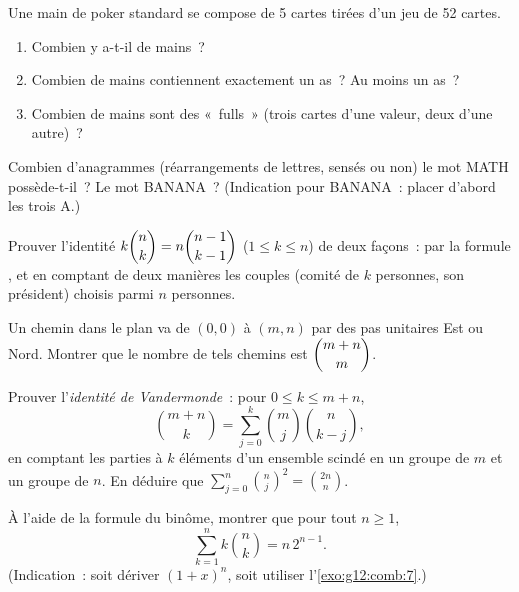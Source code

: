\begin{exercise}[$\star\star$]\label{exo:g12:comb:5}
Une main de poker standard se compose de 5 cartes tirées d'un jeu de 52
cartes.
\begin{enumerate}
  \item Combien y a-t-il de mains~?
  \item Combien de mains contiennent exactement un as~? Au moins un as~?
  \item Combien de mains sont des «~fulls~» (trois cartes d'une valeur, deux
        d'une autre)~?
\end{enumerate}
\end{exercise}

\begin{exercise}[$\star\star$]\label{exo:g12:comb:6}
Combien d'anagrammes (réarrangements de lettres, sensés ou non) le mot MATH
possède-t-il~? Le mot BANANA~?
(Indication pour BANANA~: placer d'abord les trois A.)
\end{exercise}

\begin{exercise}[$\star\star$]\label{exo:g12:comb:7}
Prouver l'identité $k\dbinom{n}{k} = n\dbinom{n-1}{k-1}$
($1 \leq k \leq n$) de deux façons~: par la formule , et en
comptant de deux manières les couples (comité de $k$ personnes, son
président) choisis parmi $n$ personnes.
\end{exercise}

\begin{exercise}[$\star\star$]\label{exo:g12:comb:8}
Un chemin dans le plan va de $(0,0)$ à $(m, n)$ par des pas unitaires Est ou
Nord. Montrer que le nombre de tels chemins est $\dbinom{m+n}{m}$.
\end{exercise}

\begin{exercise}[$\star\star\star$]\label{exo:g12:comb:9}
Prouver l'\emph{identité de Vandermonde}~: pour $0 \leq k \leq m + n$,
\[
\binom{m+n}{k} = \sum_{j=0}^{k} \binom{m}{j}\binom{n}{k-j},
\]
en comptant les parties à $k$ éléments d'un ensemble scindé en un groupe de
$m$ et un groupe de $n$. En déduire que
$\displaystyle\sum_{j=0}^{n}\binom{n}{j}^{\!2} = \binom{2n}{n}$.
\end{exercise}

\begin{exercise}[$\star\star\star$]\label{exo:g12:comb:10}
À l'aide de la formule du binôme, montrer que pour tout $n \geq 1$,
\[
\sum_{k=1}^{n} k \binom{n}{k} = n\,2^{n-1}.
\]
(Indication~: soit dériver $(1+x)^n$, soit utiliser
l'\cref{exo:g12:comb:7}.)
\end{exercise}

